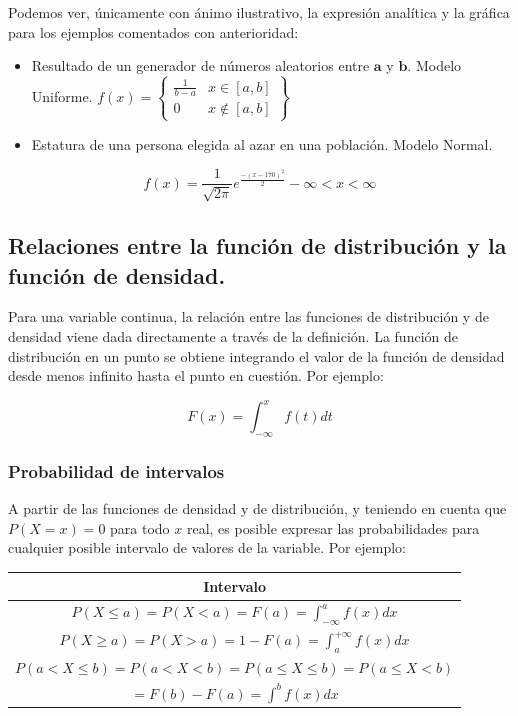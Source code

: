 \documentclass[
  a4paper,
  DIV=11,
  numbers=noendperiod]{scrreprt}
\providecommand{\tightlist}{%
  \setlength{\itemsep}{0pt}\setlength{\parskip}{0pt}}\usepackage{longtable,booktabs,array}
\begin{document}
Podemos ver, únicamente con ánimo ilustrativo, la expresión analítica y
la gráfica para los ejemplos comentados con anterioridad:

\begin{itemize}
\tightlist
\item
  Resultado de un generador de números aleatorios entre
  \(\boldsymbol{a}\) y \(\boldsymbol{b}\). Modelo Uniforme.
  \(f(x)=\left\{\begin{array}{cc}\frac{1}{b-a} & x \in[a, b] \\ 0 & x \notin[a, b]\end{array}\right\}\)
\item
  Estatura de una persona elegida al azar en una población. Modelo
  Normal.
\end{itemize}

\[
f(x)=\frac{1}{\sqrt{2 \pi}} e^{\frac{-(x-170)^{2}}{2}}-\infty<x<\infty
\]

\subsection{Relaciones entre la función de distribución y la función de
densidad.}\label{relaciones-entre-la-funciuxf3n-de-distribuciuxf3n-y-la-funciuxf3n-de-densidad.}

Para una variable continua, la relación entre las funciones de
distribución y de densidad viene dada directamente a través de la
definición. La función de distribución en un punto se obtiene integrando
el valor de la función de densidad desde menos infinito hasta el punto
en cuestión. Por ejemplo:

\[
F(x)=\int_{-\infty}^{x} f(t) d t
\]

\subsubsection{Probabilidad de
intervalos}\label{probabilidad-de-intervalos}

A partir de las funciones de densidad y de distribución, y teniendo en
cuenta que \(P(X=x)=0\) para todo \(x\) real, es posible expresar las
probabilidades para cualquier posible intervalo de valores de la
variable. Por ejemplo:

\begin{longtable}[]{@{}c@{}}
\toprule\noalign{}
Intervalo \\
\midrule\noalign{}
\endhead
\bottomrule\noalign{}
\endlastfoot
\(P(X \leq a)=P(X<a)=F(a)=\int_{-\infty}^{a} f(x) d x\) \\
\(P(X \geq a)=P(X>a)=1-F(a)=\int_{a}^{+\infty} f(x) d x\) \\
\(P(a<X \leq b)=P(a<X<b)=P(a \leq X \leq b)=P(a \leq X<b)\) \\
\(=F(b)-F(a)=\int^{b} f(x) d x\) \\
\end{longtable}
\end{document}

